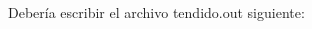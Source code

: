 \begin{multicols}{2}

\justify Debería escribir el archivo tendido.out siguiente:\\

\noindent
{}


\end{multicols}
    



